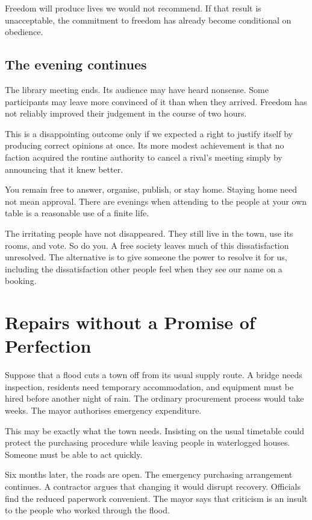 \documentclass[12pt,a4paper]{book}
\begin{document}
Freedom will produce lives we would not recommend. If that result is unacceptable, the commitment to freedom has already become conditional on obedience.

\section*{The evening continues}

The library meeting ends. Its audience may have heard nonsense. Some participants may leave more convinced of it than when they arrived. Freedom has not reliably improved their judgement in the course of two hours.

This is a disappointing outcome only if we expected a right to justify itself by producing correct opinions at once. Its more modest achievement is that no faction acquired the routine authority to cancel a rival's meeting simply by announcing that it knew better.

You remain free to answer, organise, publish, or stay home. Staying home need not mean approval. There are evenings when attending to the people at your own table is a reasonable use of a finite life.

The irritating people have not disappeared. They still live in the town, use its rooms, and vote. So do you. A free society leaves much of this dissatisfaction unresolved. The alternative is to give someone the power to resolve it for us, including the dissatisfaction other people feel when they see our name on a booking.

\chapter{Repairs without a Promise of Perfection}

Suppose that a flood cuts a town off from its usual supply route. A bridge needs inspection, residents need temporary accommodation, and equipment must be hired before another night of rain. The ordinary procurement process would take weeks. The mayor authorises emergency expenditure.

This may be exactly what the town needs. Insisting on the usual timetable could protect the purchasing procedure while leaving people in waterlogged houses. Someone must be able to act quickly.

Six months later, the roads are open. The emergency purchasing arrangement continues. A contractor argues that changing it would disrupt recovery. Officials find the reduced paperwork convenient. The mayor says that criticism is an insult to the people who worked through the flood.
\end{document}
